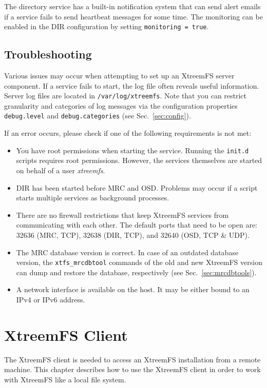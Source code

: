 \documentclass[a4paper,10pt]{book}
\begin{document}
The directory service has a built-in notification system that can send alert emails if a service fails to send heartbeat messages for some time. The monitoring can be enabled in the DIR configuration by setting \texttt{monitoring = true}.


\section{Troubleshooting}

Various issues may occur when attempting to set up an XtreemFS server component. If a service fails to start, the log file often reveals useful information. Server log files are located in \texttt{/var/log/xtreemfs}. Note that you can restrict granularity and categories of log messages via the configuration properties \texttt{debug.level} and \texttt{debug.categories} (see Sec.\ \ref{sec:config}).

If an error occurs, please check if one of the following requirements is not met:
\begin{itemize}
 \item You have root permissions when starting the service. Running the \texttt{init.d} scripts requires root permissions. However, the services themselves are started on behalf of a user \textit{xtreemfs}.
 \item DIR has been started before MRC and OSD. Problems may occur if a script starts multiple services as background processes.
 \item There are no firewall restrictions that keep XtreemFS services from communicating with each other. The default ports that need to be open are: 32636 (MRC, TCP), 32638 (DIR, TCP), and 32640 (OSD, TCP \& UDP).
 \item The MRC database version is correct. In case of an outdated database version, the \texttt{xtfs\_mrcdbtool} commands of the old and new XtreemFS version can dump and restore the database, respectively (see Sec.\ \ref{sec:mrcdbtools}).
 \item A network interface is available on the host. It may be either bound to an IPv4 or IPv6 address.
\end{itemize}


\chapter{XtreemFS Client}

The XtreemFS client is needed to access an XtreemFS installation from a remote machine. This chapter describes how to use the XtreemFS client in order to work with XtreemFS like a local file system.
\end{document}
